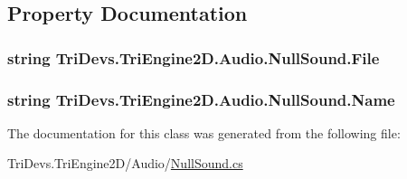 \subsection{Property Documentation}
\hypertarget{class_tri_devs_1_1_tri_engine2_d_1_1_audio_1_1_null_sound_a4fd40e54f9c2662a95a4fdf3e71bc313}{
\subsubsection[{File}]{\setlength{\rightskip}{0pt plus 5cm}string Tri\-Devs.\-Tri\-Engine2\-D.\-Audio.\-Null\-Sound.\-File\hspace{0.3cm}{\ttfamily [get]}}}\label{class_tri_devs_1_1_tri_engine2_d_1_1_audio_1_1_null_sound_a4fd40e54f9c2662a95a4fdf3e71bc313}
\hypertarget{class_tri_devs_1_1_tri_engine2_d_1_1_audio_1_1_null_sound_af410987f6fe015f500abe45c2ffdf6d6}{
\subsubsection[{Name}]{\setlength{\rightskip}{0pt plus 5cm}string Tri\-Devs.\-Tri\-Engine2\-D.\-Audio.\-Null\-Sound.\-Name\hspace{0.3cm}{\ttfamily [get]}}}\label{class_tri_devs_1_1_tri_engine2_d_1_1_audio_1_1_null_sound_af410987f6fe015f500abe45c2ffdf6d6}


The documentation for this class was generated from the following file\-:\begin{DoxyCompactItemize}
\item 
Tri\-Devs.\-Tri\-Engine2\-D/\-Audio/\hyperlink{_null_sound_8cs}{Null\-Sound.\-cs}\end{DoxyCompactItemize}
